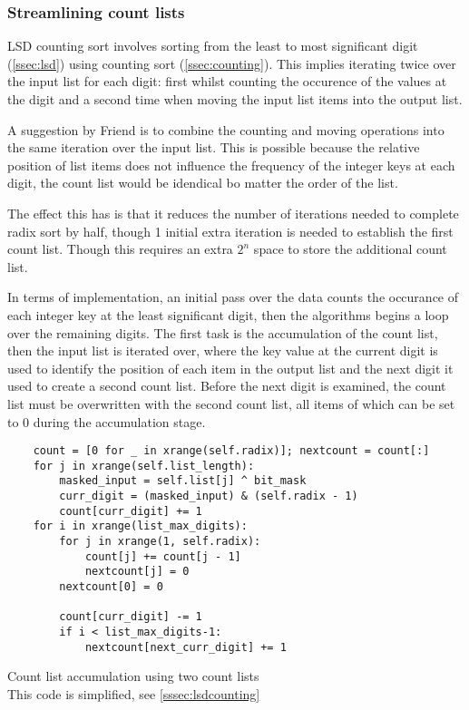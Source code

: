 \documentclass[12pt]{article}
\begin{document}
\subsubsection{Streamlining count lists}
\label{sssec:countlist}
LSD counting sort involves sorting from the least to most significant digit (\ref{ssec:lsd}) using counting sort (\ref{ssec:counting}). This implies iterating twice over the input list for each digit: first whilst counting the occurence of the values at the digit and a second time when moving the input list items into the output list.
\par
A suggestion by Friend \cite{Friend} is to combine the counting and moving operations into the same iteration over the input list. This is possible because the relative position of list items does not influence the frequency of the integer keys at each digit, the count list would be idendical bo matter the order of the list.
\par
The effect this has is that it reduces the number of iterations needed to complete radix sort by half, though 1 initial extra iteration is needed to establish the first count list. Though this requires an extra $2^n$ space to store the additional count list.
\par 
In terms of implementation, an initial pass over the data counts the occurance of each integer key at the least significant digit, then the algorithms begins a loop over the remaining digits. The first task is the accumulation of the count list, then the input list is iterated over, where the key value at the current digit is used to identify the position of each item in the output list and the next digit it used to create a second count list. Before the next digit is examined, the count list must be overwritten with the second count list, all items of which can be set to 0 during the accumulation stage.
\begin{table}[H]
	\centering
\begin{lstlisting}
	count = [0 for _ in xrange(self.radix)]; nextcount = count[:]
	for j in xrange(self.list_length):
		masked_input = self.list[j] ^ bit_mask
		curr_digit = (masked_input) & (self.radix - 1)
		count[curr_digit] += 1
	for i in xrange(list_max_digits):
		for j in xrange(1, self.radix):                    
			count[j] += count[j - 1]
			nextcount[j] = 0
		nextcount[0] = 0

		count[curr_digit] -= 1
		if i < list_max_digits-1:
			nextcount[next_curr_digit] += 1
\end{lstlisting}
\caption*{Count list accumulation using two count lists \\ This code is simplified, see \ref{sssec:lsdcounting}}
\end{table}
\end{document}
